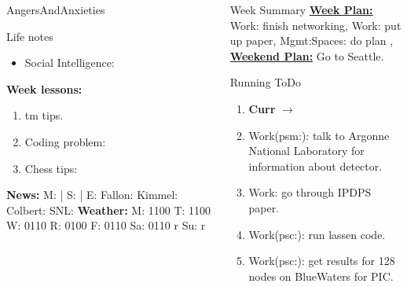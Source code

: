 \begin{columns}
\begin{column}{0.20\linewidth}
\begin{block}{AngersAndAnxieties}
\begin{itemize}
      \end{itemize}
    \end{block}
      \begin{block}{Life notes}
        \begin{itemize}
          \tiny \item \tiny Social Intelligence: 
        \end{itemize}
      \end{block}
      \begin{block}
        {\tiny {\bf Week lessons:}}
        \begin{enumerate}
        \item \tiny tm tips.
        \item \tiny Coding problem: 
        \item \tiny Chess tips: 
        \end{enumerate}
            {{\tiny {\tiny \bf  News:}} {\tiny  M:  | S: 
                | E: Fallon:  Kimmel:  Colbert: SNL:}}
            {{\tiny {\tiny \bf  Weather:}} {\tiny M: 1100 T: 1100 W:
                0110 R: 0100 F: 0110 Sa: 0110 r Su: r }} 

      \end{block}
  \end{column}
  \begin{column}{0.6\linewidth}
    \begin{block}{Week Summary} 
      {\underline {\bf Week Plan:} Work: finish networking, Work: put
        up paper, Mgmt:Spaces: do plan , 
      }\\
      {\underline{\bf Weekend Plan:} Go to Seattle. } \\

    \end{block}
    \begin{block}{Running ToDo} %

\begin{enumerate}
    \item \tiny \textbf{Curr} $\rightarrow$ 
    \item \tiny Work(psm:): talk to Argonne National Laboratory for
      information about detector.
    \item \tiny Work: go through IPDPS paper.  
    \item \tiny Work(psc:): run lassen code. 
    \item \tiny Work(psc:): get results for 128 nodes on BlueWaters for PIC.
      

\end{enumerate}
\end{block}
\end{column}
\end{columns}
